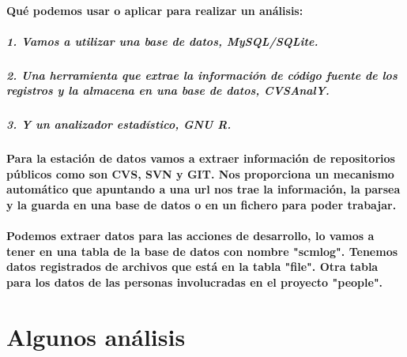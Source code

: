 \paragraph{Qu\'e podemos usar o aplicar para realizar un an\'alisis:}
\subparagraph{1. Vamos a utilizar una base de datos, MySQL/SQLite.}
\subparagraph{2. Una herramienta que extrae la informaci\'on de c\'odigo fuente de los registros y la almacena en una base de datos, CVSAnalY.}
\subparagraph{3. Y un analizador estad\'istico, GNU R.}
\paragraph{Para la estaci\'on de datos vamos a extraer informaci\'on de repositorios p\'ublicos como son CVS, SVN y GIT. Nos proporciona un mecanismo autom\'atico que apuntando a una url nos trae la informaci\'on, la parsea y la guarda en una base de datos o en un fichero para poder trabajar.}
\paragraph{Podemos extraer datos para las acciones de desarrollo, lo vamos a tener en una tabla de la base de datos con nombre "scmlog".
Tenemos datos registrados de archivos que est\'a en la tabla "file".
Otra tabla para los datos de las personas involucradas en el proyecto "people".}
\section{Algunos an\'alisis}

